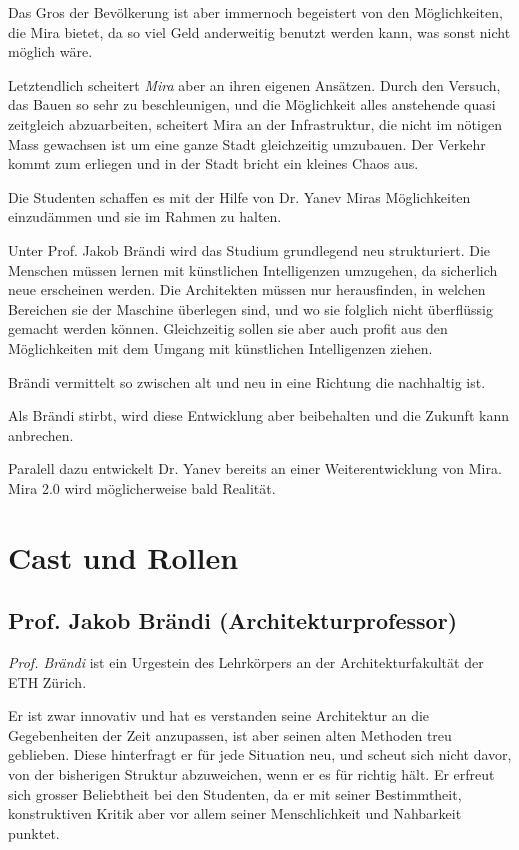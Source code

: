 \documentclass[11pt,a4paper,ngerman]{scrreprt}
\begin{document}
Das Gros der Bevölkerung ist aber immernoch begeistert von den Möglichkeiten,
die Mira bietet, da so viel Geld anderweitig benutzt werden kann, was sonst
nicht möglich wäre.

Letztendlich scheitert \emph{Mira} aber an ihren eigenen Ansätzen. Durch den Versuch,
das Bauen so sehr zu beschleunigen, und die Möglichkeit alles anstehende quasi
zeitgleich abzuarbeiten, scheitert Mira an der Infrastruktur, die nicht im
nötigen Mass gewachsen ist um eine ganze Stadt gleichzeitig umzubauen. Der
Verkehr kommt zum erliegen und in der Stadt bricht ein kleines Chaos aus.

Die Studenten schaffen es mit der Hilfe von Dr. Yanev Miras Möglichkeiten
einzudämmen und sie im Rahmen zu halten.

Unter Prof. Jakob Brändi wird das Studium grundlegend neu strukturiert. Die
Menschen müssen lernen mit künstlichen Intelligenzen umzugehen, da sicherlich
neue erscheinen werden. Die Architekten müssen nur herausfinden, in welchen
Bereichen sie der Maschine überlegen sind, und wo sie folglich nicht überflüssig
gemacht werden können. Gleichzeitig sollen sie aber auch profit aus den
Möglichkeiten mit dem Umgang mit künstlichen Intelligenzen ziehen.

Brändi vermittelt so zwischen alt und neu in eine Richtung die nachhaltig ist.

Als Brändi stirbt, wird diese Entwicklung aber beibehalten und die Zukunft kann
anbrechen.

Paralell dazu entwickelt Dr. Yanev bereits an einer Weiterentwicklung von
Mira. Mira 2.0 wird möglicherweise bald Realität.

\chapter*{Cast und Rollen}
\section*{Prof. Jakob Brändi (Architekturprofessor)}

\emph{Prof. Brändi} ist ein Urgestein des Lehrkörpers an der Architekturfakultät der
ETH Zürich.

Er ist zwar innovativ und hat es verstanden seine Architektur an die
Gegebenheiten der Zeit anzupassen, ist aber seinen alten Methoden treu
geblieben. Diese hinterfragt er für jede Situation neu, und scheut sich nicht
davor, von der bisherigen Struktur abzuweichen, wenn er es für richtig hält. Er
erfreut sich grosser Beliebtheit bei den Studenten, da er mit seiner
Bestimmtheit, konstruktiven Kritik aber vor allem seiner Menschlichkeit und
Nahbarkeit punktet.
\end{document}
